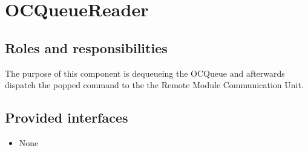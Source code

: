 \section{OCQueueReader}
\label{element:oc-queue-reader}

\subsection{Roles and responsibilities}

\npar The purpose of this component is dequeueing the OCQueue and
afterwards dispatch the popped command to the the Remote Module Communication
Unit.

\subsection{Provided interfaces}

\begin{itemize}
  \item None
\end{itemize}
